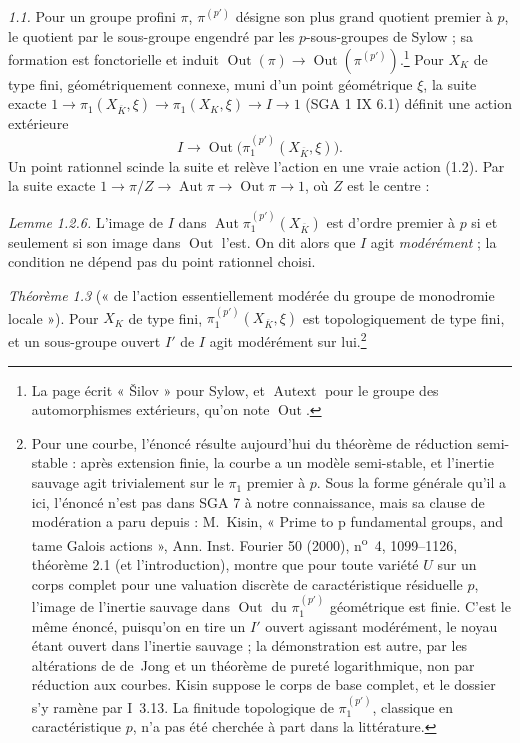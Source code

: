 \documentclass[11pt,a4paper]{article}
\begin{document}
\emph{1.1.} Pour un groupe profini $\pi$, $\pi^{(p')}$ désigne son plus grand
quotient premier à $p$, le quotient par le sous-groupe engendré par les
$p$-sous-groupes de Sylow ; sa formation est fonctorielle et induit
$\operatorname{Out}(\pi) \to \operatorname{Out}(\pi^{(p')})$.\footnote{La page
écrit « Šilov » pour Sylow, et $\operatorname{Autext}$ pour le groupe des
automorphismes extérieurs, qu'on note $\operatorname{Out}$.} Pour $X_K$ de type
fini, géométriquement connexe, muni d'un point géométrique $\xi$, la suite exacte
$1 \to \pi_1(X_{\overline K}, \xi) \to \pi_1(X_K, \xi) \to I \to 1$
(SGA 1 IX 6.1) définit une action extérieure
\[
  I \longrightarrow \operatorname{Out}\bigl(\pi_1^{(p')}(X_{\overline K}, \xi)\bigr) .
\]
Un point rationnel scinde la suite et relève l'action en une vraie action
(1.2). Par la suite exacte $1 \to \pi/Z \to \operatorname{Aut}\pi \to
\operatorname{Out}\pi \to 1$, où $Z$ est le centre :

\emph{Lemme 1.2.6.} L'image de $I$ dans $\operatorname{Aut}
\pi_1^{(p')}(X_{\overline K})$ est d'ordre premier à $p$ si et seulement si son
image dans $\operatorname{Out}$ l'est. On dit alors que $I$ agit
\emph{modérément} ; la condition ne dépend pas du point rationnel choisi.

\emph{Théorème 1.3} (« de l'action essentiellement modérée du groupe de
monodromie locale »). Pour $X_K$ de type fini, $\pi_1^{(p')}(X_{\overline K},
\xi)$ est topologiquement de type fini, et un sous-groupe ouvert $I'$ de $I$ agit
modérément sur lui.\footnote{Pour une courbe, l'énoncé résulte aujourd'hui du
théorème de réduction semi-stable : après extension finie, la courbe a un
modèle semi-stable, et l'inertie sauvage agit trivialement sur le $\pi_1$
premier à $p$. Sous la forme générale qu'il a ici, l'énoncé n'est pas dans
SGA 7 à notre connaissance, mais sa clause de modération a paru depuis :
M.~Kisin, « Prime to p fundamental groups, and tame Galois actions », Ann.
Inst. Fourier 50 (2000), n\textsuperscript{o}~4, 1099--1126, théorème 2.1
(et l'introduction), montre que pour toute variété $U$ sur un corps complet
pour une valuation discrète de caractéristique résiduelle $p$, l'image de
l'inertie sauvage dans $\operatorname{Out}$ du $\pi_1^{(p')}$ géométrique est
finie. C'est le même énoncé, puisqu'on en tire un $I'$ ouvert agissant
modérément, le noyau étant ouvert dans l'inertie sauvage ; la démonstration
est autre, par les altérations de de~Jong et un théorème de pureté
logarithmique, non par réduction aux courbes. Kisin suppose le corps de base
complet, et le dossier s'y ramène par I~3.13. La finitude topologique de
$\pi_1^{(p')}$, classique en caractéristique $p$, n'a pas été cherchée à part
dans la littérature.}
\end{document}

